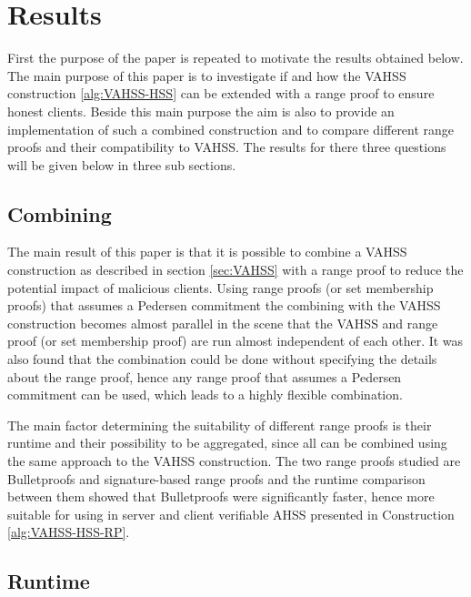 \chapter{Results}
\label{ch:results}

First the purpose of the paper is repeated to motivate the results obtained below. The main purpose of this paper is to investigate if  and how the VAHSS construction \ref{alg:VAHSS-HSS} can be extended with a range proof to ensure honest clients. Beside this main purpose the aim is also to provide an implementation of such a combined construction and to compare different range proofs and their compatibility to VAHSS. The results for there three questions will be given below in three sub sections. 

\section{Combining}
The main result of this paper is that it is possible to combine a VAHSS construction as described in section \ref{sec:VAHSS} with a range proof to reduce the potential impact of malicious clients. Using range proofs (or set membership proofs) that assumes a Pedersen commitment the combining with the VAHSS construction becomes almost parallel in the scene that the VAHSS and range proof (or set membership proof) are run almost independent of each other. It was also found that the combination could be done without specifying the details about the range proof, hence any range proof that assumes a Pedersen commitment can be used, which leads to a highly flexible combination.  

The main factor determining the suitability of different range proofs is their runtime and their possibility to be aggregated, since all can be combined using the same approach to the VAHSS construction. The two range proofs studied are Bulletproofs and signature-based range proofs and the runtime comparison between them showed that Bulletproofs were significantly faster, hence more suitable for using in server and client verifiable AHSS presented in Construction \ref{alg:VAHSS-HSS-RP}. 

\section{Runtime}

